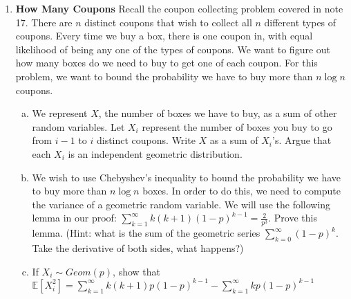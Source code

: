 \documentclass[11pt]{article}
\newif\ifsolutions
\begin{document}
\begin{enumerate}
\item {\bf How Many Coupons}
Recall the coupon collecting problem covered in note 17. There are $n$ distinct coupons that wish to collect all $n$ different types of coupons. Every time we buy a box, there is one coupon in, with equal likelihood of being any one of the types of coupons. We want to figure out how many boxes do we need to buy to get one of each coupon. For this problem, we want to bound the probability we have to buy more than $n\log{n}$ coupons.
\begin{enumerate}[a)]
\item We represent $X$, the number of boxes we have to buy, as a sum of other random variables. Let $X_i$ represent the number of boxes you buy to go from $i-1$ to $i$ distinct coupons. Write $X$ as a sum of $X_i$'s. Argue that each $X_i$ is an independent geometric distribution.

\ifsolutions{\color{blue}{
$X = \sum\nolimits_{i=0}^n X_i$ \hspace{5mm} Each $X_i \sim Geo(\frac{n-i}{n})$
}}\fi

\item We wish to use Chebyshev's inequality to bound the probability we have to buy more than $n \log{n}$ boxes. In order to do this, we need to compute the variance of a geometric random variable. We will use the following lemma in our proof: $\sum\nolimits_{k=1}^{\infty} k(k+1)(1-p)^{k-1} = \frac{2}{p^3}$. Prove this lemma. (Hint: what is the sum of the geometric series $\sum\nolimits_{k=0}^{\infty} (1-p)^k$. Take the derivative of both sides, what happens?)

\ifsolutions{\color{blue}{
$\sum\nolimits_{k=0}^{\infty} (1-p)^k = \frac{1}{p}$ take derivative of both sides twice. \\ $-\sum\nolimits_{k=0}^{\infty} k(1-p)^{k-1} = -\frac{1}{p^2}$  \\ $\sum\nolimits_{k=0}^{\infty} k(k-1)(1-p)^{k-2} = \frac{2}{p^3}$ Notice that $k=0$ means the LHS is 0
\\ $\sum\nolimits_{k=1}^{\infty} k(k-1)(1-p)^{k-2} = \frac{2}{p^3}$ 

$\sum\nolimits_{j=0}^{\infty} (j+1)j(1-p)^{j-1} = \frac{2}{p^3}$ change summation bounds  $j = k-1$

}}\fi




\item If $X_i \sim Geom(p)$, show that $\mathbb{E}[X_i^2] = \sum\nolimits_{k=1}^{\infty} k(k+1)p(1-p)^{k-1} - \sum\nolimits_{k=1}^{\infty} kp(1-p)^{k-1}$


\end{enumerate}
\end{enumerate}
\end{document}
